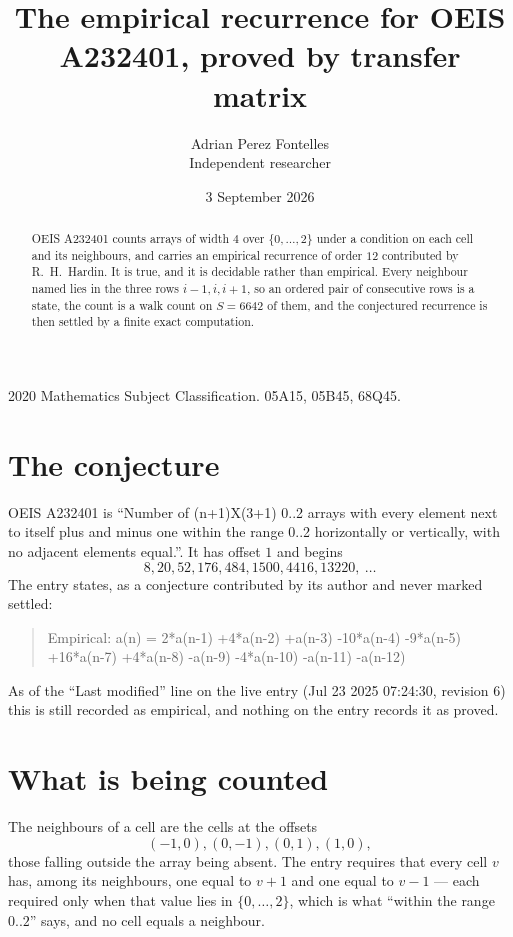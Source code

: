 \documentclass[11pt,a4paper]{article}
\title{The empirical recurrence for OEIS A232401, proved by transfer matrix}
\author{Adrian Perez Fontelles\\ \small Independent researcher}
\date{3 September 2026}
\theoremstyle{plain}
\theoremstyle{definition}
\begin{document}
\maketitle

\begin{abstract}
OEIS A232401 counts arrays of width $4$ over $\{0,\dots,2\}$ under a condition on each cell
and its neighbours, and carries an empirical recurrence of order $12$ contributed by
R.~H.~Hardin. It is true, and it is decidable rather than empirical. Every neighbour named lies
in the three rows $i-1,i,i+1$, so an ordered pair of consecutive rows is a state, the count is
a walk count on $S=6642$ of them, and the conjectured recurrence is then settled by a finite
exact computation.
\end{abstract}

\noindent\small 2020 Mathematics Subject Classification. 05A15, 05B45, 68Q45.\normalsize

\section{The conjecture}

OEIS A232401 is ``Number of (n+1)X(3+1) 0..2 arrays with every element next to itself plus and minus one within the range 0..2 horizontally or vertically, with no adjacent elements equal.''. It has offset $1$ and begins
\[
8, 20, 52, 176, 484, 1500, 4416, 13220,\ \dots
\]
The entry states, as a conjecture contributed by its author and never marked settled:
\begin{quote}
Empirical: a(n) = 2*a(n-1) +4*a(n-2) +a(n-3) -10*a(n-4) -9*a(n-5) +16*a(n-7) +4*a(n-8) -a(n-9) -4*a(n-10) -a(n-11) -a(n-12)
\end{quote}
As of the ``Last modified'' line on the live entry (Jul 23 2025 07:24:30, revision 6) this is still
recorded as empirical, and nothing on the entry records it as proved.

\section{What is being counted}

The neighbours of a cell are the cells at the offsets
\[
(-1,0), (0,-1), (0,1), (1,0),
\]
those falling outside the array being absent. The entry requires that every cell $v$ has, among its neighbours, one equal to $v+1$ and one equal to $v-1$ --- each required only when that value lies in $\{0,\dots,2\}$, which is what ``within the range $0..2$'' says, and no cell equals a neighbour.
\end{document}
